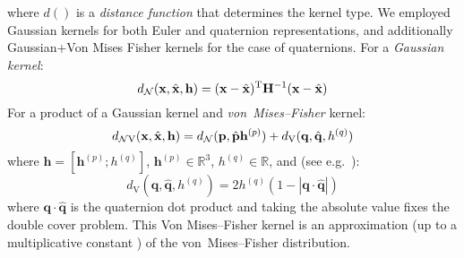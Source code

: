 \noindent where $d()$ is a \textit{distance function} that determines the kernel type. We employed Gaussian kernels for both Euler and quaternion representations, and additionally Gaussian+Von Mises Fisher kernels for the case of quaternions. For a \textit{Gaussian kernel}:
\begin{equation}
d_\mathrm{\mathcal{N}}(\mathbf{x}, \hat{\mathbf{x}}, \mathbf{h}) =
(\mathbf{x} - \hat{\mathbf{x}})^\mathrm{T}\mathbf{H}^{-1}(\mathbf{x} - \hat{\mathbf{x}})
\label{eq:Density.Estimation.gaussiandist}
\end{equation}
For a product of a Gaussian kernel and \textit{von~Mises--Fisher} kernel:
\begin{equation}
d_\mathrm{\mathcal{N}V}(\mathbf{x}, \hat{\mathbf{x}}, \mathbf{h}) =
d_\mathrm{\mathcal{N}}(\mathbf{p}, \hat{\mathbf{p}} \mathbf{h}^{(p)})  + d_\mathrm{V}(\mathbf{q}, \hat{\mathbf{q}}, h^{(q)})
\label{eq:Density.Estimation.gaussvmfdist}
\end{equation}
\noindent where %
$\mathbf{h} = \left[ \mathbf{h}^{(p)} ; h^{(q)} \right]$,
$\mathbf{h}^{(p)} \in \mathbb{R}^3$,
$h^{(q)} \in \mathbb{R}$,
and (see e.g.\ \citep{abramowitz_handbook_1965}):
\begin{equation}
d_\mathrm{V}(\mathbf{q}, \hat{\mathbf{q}}, h^{(q)}) =
2 h^{(q)} \left(1 - \left| \mathbf{q} \cdot \hat{\mathbf{q}} \right|\right)
\label{eq:Density.Estimation.vmfdist}
\end{equation}
\noindent where $\mathbf{q} \cdot \hat{\mathbf{q}}$ is the quaternion dot product and taking the absolute value fixes the double cover problem. This Von Mises--Fisher kernel is an approximation (up to a multiplicative constant \citep{detry_learning_2010}) of the von~Mises--Fisher distribution.

